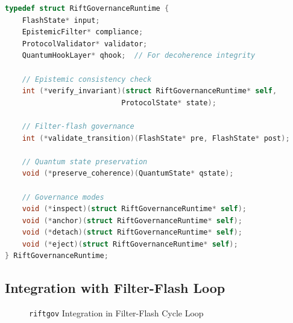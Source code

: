 \documentclass[11pt,a4paper]{article}
\begin{document}
\begin{lstlisting}[language=C, basicstyle=\small]
typedef struct RiftGovernanceRuntime {
    FlashState* input;
    EpistemicFilter* compliance;
    ProtocolValidator* validator;
    QuantumHookLayer* qhook;  // For decoherence integrity
    
    // Epistemic consistency check
    int (*verify_invariant)(struct RiftGovernanceRuntime* self, 
                           ProtocolState* state);
    
    // Filter-flash governance
    int (*validate_transition)(FlashState* pre, FlashState* post);
    
    // Quantum state preservation
    void (*preserve_coherence)(QuantumState* qstate);
    
    // Governance modes
    void (*inspect)(struct RiftGovernanceRuntime* self);
    void (*anchor)(struct RiftGovernanceRuntime* self);
    void (*detach)(struct RiftGovernanceRuntime* self);
    void (*eject)(struct RiftGovernanceRuntime* self);
} RiftGovernanceRuntime;
\end{lstlisting}

\subsection{Integration with Filter-Flash Loop}

\begin{figure}[h]
\centering
{}
\caption{\texttt{riftgov} Integration in Filter-Flash Cycle Loop}
\end{figure}
\end{document}
